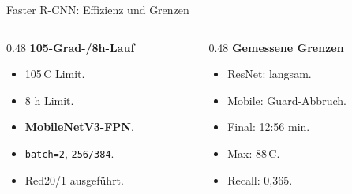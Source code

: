 \begin{frame}{Faster R-CNN: Effizienz und Grenzen}
\scriptsize
\begin{columns}[T,onlytextwidth]
\begin{column}{0.48\textwidth}
\textbf{105-Grad-/8h-Lauf}
\begin{itemize}\setlength\itemsep{0.08em}
    \item 105\,\textdegree C Limit.
    \item 8 h Limit.
    \item \textbf{MobileNetV3-FPN}.
    \item \texttt{batch=2}, \texttt{256/384}.
    \item Red20/1 ausgeführt.
\end{itemize}
\end{column}
\begin{column}{0.48\textwidth}
\textbf{Gemessene Grenzen}
\begin{itemize}\setlength\itemsep{0.08em}
    \item ResNet: langsam.
    \item Mobile: Guard-Abbruch.
    \item Final: 12:56 min.
    \item Max: 88\,\textdegree C.
    \item Recall: 0,365.
\end{itemize}
\end{column}
\end{columns}
\end{frame}
